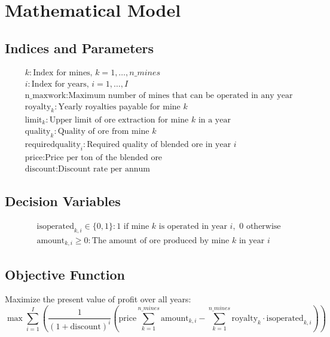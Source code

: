 \documentclass{article}
\begin{document}
\section*{Mathematical Model}

\subsection*{Indices and Parameters}
\begin{align*}
    &k: \text{Index for mines, } k = 1, \ldots, n\_mines\\
    &i: \text{Index for years, } i = 1, \ldots, I\\
    &\text{n\_maxwork}: \text{Maximum number of mines that can be operated in any year}\\
    &\text{royalty}_k: \text{Yearly royalties payable for mine } k\\
    &\text{limit}_k: \text{Upper limit of ore extraction for mine } k \text{ in a year}\\
    &\text{quality}_k: \text{Quality of ore from mine } k\\
    &\text{requiredquality}_i: \text{Required quality of blended ore in year } i\\
    &\text{price}: \text{Price per ton of the blended ore}\\
    &\text{discount}: \text{Discount rate per annum}
\end{align*}

\subsection*{Decision Variables}
\begin{align*}
    &\text{isoperated}_{k,i} \in \{0, 1\}: \text{1 if mine } k \text{ is operated in year } i, \text{ 0 otherwise}\\
    &\text{amount}_{k,i} \geq 0: \text{The amount of ore produced by mine } k \text{ in year } i
\end{align*}

\subsection*{Objective Function}
Maximize the present value of profit over all years:
\[
\max \sum_{i=1}^{I} \left( \frac{1}{(1 + \text{discount})^i} \left( \text{price} \sum_{k=1}^{n\_mines} \text{amount}_{k,i} - \sum_{k=1}^{n\_mines} \text{royalty}_k \cdot \text{isoperated}_{k,i} \right) \right)
\]
\end{document}

